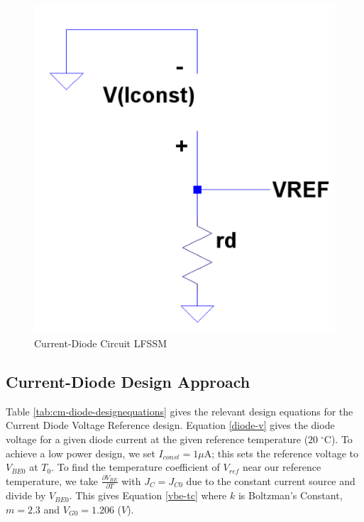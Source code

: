 \documentclass[conference]{IEEEtran}
\begin{document}
\begin{figure}[!htbp]
  \centering
  \includegraphics[scale=0.25]{images/cm-diode1-ss.png}
  \caption[cm-diode1-ss]{Current-Diode Circuit LFSSM}
  \label{fig:cm-diode1-ss}
\end{figure}

\subsection{Current-Diode Design Approach}
Table \ref{tab:cm-diode-designequations} gives the relevant design equations for the Current Diode Voltage Reference design.  Equation \ref{diode-v} gives the diode voltage for a given diode current at the given reference temperature ($20\;^{\circ}$C).  To achieve a low power design, we set $I_{const} = 1\mu$A; this sets the reference voltage to $V_{BE0}$ at $T_0$.  To find the temperature coefficient of $V_{ref}$ near our reference temperature, we take $\frac{\partial{V_{BE}}}{\partial{T}}$ with $J_C = J_{C0}$ due to the constant current source and divide by $V_{BE0}$.  This gives Equation \ref{vbe-tc} where $k$ is Boltzman's Constant, $m = 2.3$ and $V_{G0} = 1.206$ ($V$).
\end{document}
